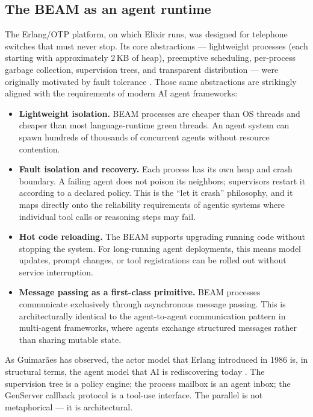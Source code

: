 \documentclass[11pt]{article}
\newcommand{\elixir}{Elixir}
\begin{document}
\subsection{The BEAM as an agent runtime}

The Erlang/OTP platform, on which \elixir{} runs, was designed for telephone switches that must never stop. Its core abstractions --- lightweight processes (each starting with approximately 2\,KB of heap), preemptive scheduling, per-process garbage collection, supervision trees, and transparent distribution --- were originally motivated by fault tolerance \cite{nvlang}. Those same abstractions are strikingly aligned with the requirements of modern AI agent frameworks:

\begin{itemize}
  \item \textbf{Lightweight isolation.} BEAM processes are cheaper than OS threads and cheaper than most language-runtime green threads. An agent system can spawn hundreds of thousands of concurrent agents without resource contention.
  \item \textbf{Fault isolation and recovery.} Each process has its own heap and crash boundary. A failing agent does not poison its neighbors; supervisors restart it according to a declared policy. This is the ``let it crash'' philosophy, and it maps directly onto the reliability requirements of agentic systems where individual tool calls or reasoning steps may fail.
  \item \textbf{Hot code reloading.} The BEAM supports upgrading running code without stopping the system. For long-running agent deployments, this means model updates, prompt changes, or tool registrations can be rolled out without service interruption.
  \item \textbf{Message passing as a first-class primitive.} BEAM processes communicate exclusively through asynchronous message passing. This is architecturally identical to the agent-to-agent communication pattern in multi-agent frameworks, where agents exchange structured messages rather than sharing mutable state.
\end{itemize}

As Guimar\~{a}es has observed, the actor model that Erlang introduced in 1986 is, in structural terms, the agent model that AI is rediscovering today \cite{guimaraes}. The supervision tree is a policy engine; the process mailbox is an agent inbox; the GenServer callback protocol is a tool-use interface. The parallel is not metaphorical --- it is architectural.
\end{document}
